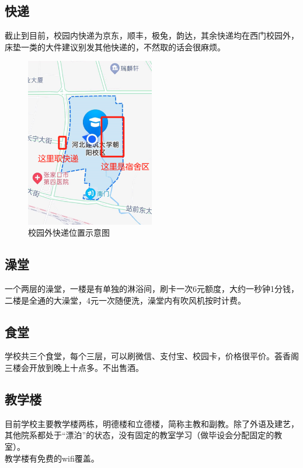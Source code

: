 \documentclass[12pt]{article} %
\begin{document}
	\subsection{快递} 
截止到目前，校园内快递为京东，顺丰，极兔，韵达，其余快递均在西门校园外，床垫一类的大件建议别发其他快递的，不然取的话会很麻烦。
		\begin{figure}[h]
		\centering
		\includegraphics[width=0.5\textwidth]{20240717154657.png}
		\caption{校园外快递位置示意图} %
	\end{figure}
	
	
	
	\subsection{澡堂} 
	一个两层的澡堂，一楼是有单独的淋浴间，刷卡一次6元额度，大约一秒钟1分钱，二楼是全通的大澡堂，4元一次随便洗，澡堂内有吹风机按时计费。
	
	\subsection{食堂}
	学校共三个食堂，每个三层，可以刷微信、支付宝、校园卡，价格很平价。荟香阁三楼会开放到晚上十点多。不出售酒。
	
	\subsection{教学楼}
	目前学校主要教学楼两栋，明德楼和立德楼，简称主教和副教。除了外语及建艺，其他院系都处于“漂泊”的状态，没有固定的教室学习（做毕设会分配固定的教室）。\\
	
	教学楼有免费的wifi覆盖。\\
	
\end{document}
